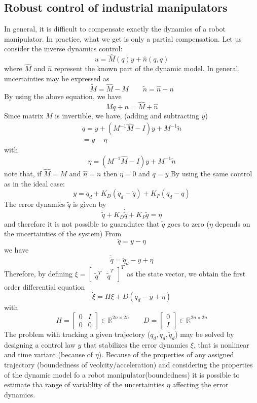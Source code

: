 \documentclass{book}
\begin{document}
\subsection{Robust control of industrial manipulators}
In general, it is difficult to compensate exactly the dynamics of a robot manipulator. In practice, what we get is only a partial compensation. Let us consider the inverse dynamics control:
\[
    u=\hat{M}(q)y+\hat{n}(q,\dot{q})
\]
where $\hat{M}$ and $\hat{n}$ represent the known part of the dynamic model. In general, uncertainties may be expressed as 
\[
    \tilde{M}=\hat{M}-M \qquad \tilde{n} = \hat{n} - n
\]
By using the above equation, we have
\[
    M\ddot{q}+n=\hat{M}+\hat{n}
\]
Since matrix $M$ is invertible, we have, (adding and subtracting $y$)
\begin{gather*}
    \ddot{q} = y + (M^{-1}\hat{M}-I)y+M^{-1}\tilde{n}\\
    =y-\eta
\end{gather*}
with
\[
    \eta = (M^{-1}\hat{M}-I)y+M^{-1}\tilde{n}
\]
note that, if $\hat{M}=M$ and $\hat{n}=n$ then $\eta=0$ and $\ddot{q}=y$
By using the same control as in the ideal case:
\[
    y=\ddot{q}_d+K_D(\dot{q}_d-\dot{q})+K_P(q_d-q)
\]
The error dynamics $\tilde{q}$ is given by 
\[
    \ddot{\tilde{q}}+K_D\dot{\tilde{q}} + K_P\tilde{q}=\eta
\]
and therefore it is not possible to guaradntee that $\tilde{q}$ goes to zero ($\eta$ depends on the uncertainties of the system)
From
\[
    \ddot{q}=y-\eta
\]
we have 
\[
    \ddot{\tilde{q}}=\ddot{q}_d-y+\eta
\]
Therefore, by defining $\xi = \begin{bmatrix}
    \tilde{q}^T  & \dot{\tilde{q}}^T
\end{bmatrix}^T $ as the state vector, we obtain the first order differential equation
\[
    \dot{\xi} = H\xi + D(\ddot{q}_d-y+\eta)
\]
with
\[
    H=\begin{bmatrix}
        0 & I \\ 0 & 0
    \end{bmatrix} \in \mathbb{R}^{2n\times 2n} \qquad D = \begin{bmatrix}
        0 \\ I
    \end{bmatrix} \in \mathbb{R}^{2n\times 2n}
\]
The problem with tracking a given trajectory ($q_d,\dot{q}_d,\ddot{q}_d$) may be solved by designing a control law $y$ that stabilizes the error dynamics $\xi$, that is nonlinear and time variant (because of $\eta$). Because of the properties of any assigned trajectory (boundedness of veolcity/acceleration) and considering the properties of the dynamic model fo a robot manipulator(boundedness) it is possible to estimate tha range of variablity of the uncertainties $\eta$ affecting the error dynamics. 
\end{document}
